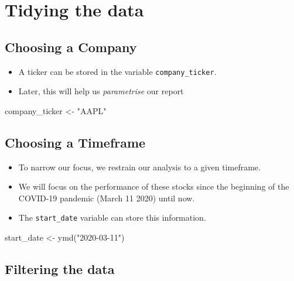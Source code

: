 \documentclass[
  letterpaper,
  DIV=11,
  numbers=noendperiod]{scrreprt}
\newenvironment{Shaded}{\begin{snugshade}}{\end{snugshade}}
\newcommand{\FunctionTok}[1]{\textcolor[rgb]{0.28,0.35,0.67}{#1}}
\newcommand{\NormalTok}[1]{\textcolor[rgb]{0.00,0.23,0.31}{#1}}
\newcommand{\OtherTok}[1]{\textcolor[rgb]{0.00,0.23,0.31}{#1}}
\newcommand{\StringTok}[1]{\textcolor[rgb]{0.13,0.47,0.30}{#1}}
\theoremstyle{definition}
\theoremstyle{remark}
\begin{document}

\chapter{Tidying the data}\label{tidying-the-data}

\section{Choosing a Company}

\begin{itemize}
\item
  A ticker can be stored in the variable \texttt{company\_ticker}.
\item
  Later, this will help us \emph{parametrise} our report
\end{itemize}

\begin{Shaded}
\begin{Highlighting}[]
\NormalTok{company\_ticker }\OtherTok{\textless{}{-}} \StringTok{"AAPL"}
\end{Highlighting}
\end{Shaded}

\section{Choosing a Timeframe}

\begin{itemize}
\item
  To narrow our focus, we restrain our analysis to a given timeframe.
\item
  We will focus on the performance of these stocks since the beginning
  of the COVID-19 pandemic (March 11 2020) until now.
\item
  The \texttt{start\_date} variable can store this information.
\end{itemize}

\begin{Shaded}
\begin{Highlighting}[]
\NormalTok{start\_date }\OtherTok{\textless{}{-}}  \FunctionTok{ymd}\NormalTok{(}\StringTok{"2020{-}03{-}11"}\NormalTok{)}
\end{Highlighting}
\end{Shaded}

\section{Filtering the data}
\end{document}
